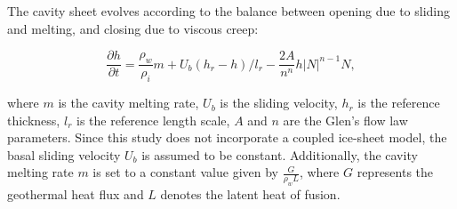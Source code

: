 \documentclass[draft]{agujournal2019}
\newcommand{\pdiff}[2]{\frac{\partial{#1}}{\partial{#2}}}
\begin{document}
The cavity sheet evolves according to the balance between opening due to sliding and melting, and closing due to viscous creep:
\begin{linenomath*}
\begin{equation}
    \pdiff{h}{t} = \frac{\rho_w}{\rho_i}m + U_b\left(h_r-h\right)/l_r - \frac{2 A}{n^n}h|N|^{n-1}N,
\end{equation}
\end{linenomath*}
where $m$ is the cavity melting rate, $U_b$ is the sliding velocity, $h_r$ is the reference thickness, $l_r$ is the reference length scale, $A$ and $n$ are the Glen's flow law parameters. Since this study does not incorporate a coupled ice-sheet model, the basal sliding velocity $U_b$ is assumed to be constant. Additionally, the cavity melting rate $m$ is set to a constant value given by $\frac{G}{\rho_w L}$, where $G$ represents the geothermal heat flux and $L$ denotes the latent heat of fusion.
\end{document}

